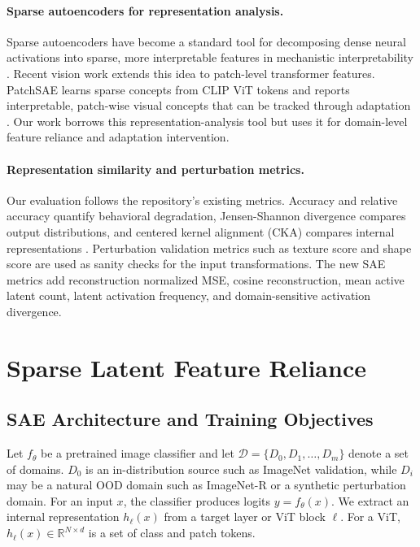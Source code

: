 \documentclass{article}
\begin{document}
\paragraph{Sparse autoencoders for representation analysis.}
Sparse autoencoders have become a standard tool for decomposing dense neural activations into sparse, more interpretable features in mechanistic interpretability \cite{bricken2023monosemanticity,gao2024scaling}. Recent vision work extends this idea to patch-level transformer features. PatchSAE learns sparse concepts from CLIP ViT tokens and reports interpretable, patch-wise visual concepts that can be tracked through adaptation \cite{lim2025patchsae}. Our work borrows this representation-analysis tool but uses it for domain-level feature reliance and adaptation intervention.

\paragraph{Representation similarity and perturbation metrics.}
Our evaluation follows the repository's existing metrics. Accuracy and relative accuracy quantify behavioral degradation, Jensen-Shannon divergence compares output distributions, and centered kernel alignment (CKA) compares internal representations \cite{kornblith2019cka}. Perturbation validation metrics such as texture score and shape score are used as sanity checks for the input transformations. The new SAE metrics add reconstruction normalized MSE, cosine reconstruction, mean active latent count, latent activation frequency, and domain-sensitive activation divergence.

\section{Sparse Latent Feature Reliance}

\subsection{SAE Architecture and Training Objectives}

Let $f_\theta$ be a pretrained image classifier and let $\mathcal{D}=\{D_0,D_1,\ldots,D_m\}$ denote a set of domains. $D_0$ is an in-distribution source such as ImageNet validation, while $D_i$ may be a natural OOD domain such as ImageNet-R or a synthetic perturbation domain. For an input $x$, the classifier produces logits $y=f_\theta(x)$. We extract an internal representation $h_\ell(x)$ from a target layer or ViT block $\ell$. For a ViT, $h_\ell(x)\in\mathbb{R}^{N\times d}$ is a set of class and patch tokens.
\end{document}
